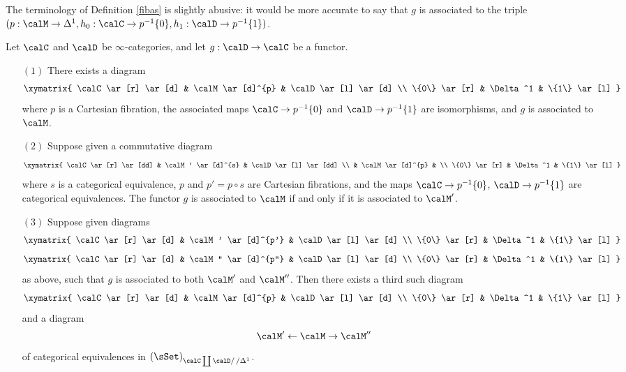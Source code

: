 \begin{remark}
The terminology of Definition \ref{fibas} is slightly abusive: it would be more accurate to say that $g$ is associated to the triple $(p: \calM \rightarrow \Delta^1, h_0: \calC \rightarrow p^{-1} \{0\},
h_1: \calD \rightarrow p^{-1} \{1\} )$. 
\end{remark}

\begin{proposition}\label{candi}
Let $\calC$ and $\calD$ be $\infty$-categories, and let $g: \calD \rightarrow \calC$
be a functor. 
\begin{itemize}
\item[$(1)$] There exists a diagram
$$ \xymatrix{ \calC \ar[r] \ar[d] & \calM \ar[d]^{p} & \calD \ar[l] \ar[d] \\
\{0\} \ar[r] & \Delta^1 & \{1\} \ar[l] }$$
where $p$ is a Cartesian fibration, the associated maps $\calC \rightarrow p^{-1} \{0\}$ and $\calD \rightarrow p^{-1} \{1\}$ are isomorphisms, and $g$ is associated to $\calM$.

\item[$(2)$] Suppose given a commutative diagram
$$ \xymatrix{ \calC \ar[r] \ar[dd] & \calM' \ar[d]^{s} & \calD \ar[l] \ar[dd] \\
& \calM \ar[d]^{p} & \\
\{0\} \ar[r] & \Delta^1 & \{1\} \ar[l] }$$ 
where $s$ is a categorical equivalence, $p$ and $p' = p \circ s$ are Cartesian fibrations,
and the maps $\calC \rightarrow p^{-1} \{0\}$, $\calD \rightarrow p^{-1} \{1\}$ are categorical equivalences. The functor $g$ is associated to $\calM$ if and only if it is associated to $\calM'$.

\item[$(3)$] Suppose given diagrams 
$$ \xymatrix{ \calC \ar[r] \ar[d] & \calM' \ar[d]^{p'} & \calD \ar[l] \ar[d] \\
\{0\} \ar[r] & \Delta^1 & \{1\} \ar[l] }$$
$$ \xymatrix{ \calC \ar[r] \ar[d] & \calM'' \ar[d]^{p''} & \calD \ar[l] \ar[d] \\
\{0\} \ar[r] & \Delta^1 & \{1\} \ar[l] }$$
as above, such that $g$ is associated to both $\calM'$ and $\calM''$. Then there
exists a third such diagram
$$ \xymatrix{ \calC \ar[r] \ar[d] & \calM \ar[d]^{p} & \calD \ar[l] \ar[d] \\
\{0\} \ar[r] & \Delta^1 & \{1\} \ar[l] }$$
and a diagram 
$$ \calM' \leftarrow \calM \rightarrow \calM''$$
of categorical equivalences in $(\sSet)_{\calC \coprod \calD/ \,/\Delta^1}$.
\end{itemize}
\end{proposition}

